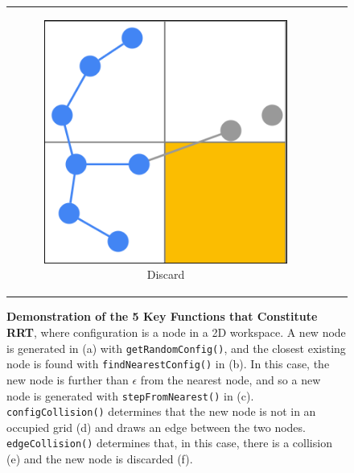 \begin{figure}[t!]
\begin{centering}
\begin{tabular}{ccc}
    \begin{subfigure}{0.3\linewidth}
    \includegraphics[width=\linewidth]{chapters/chapter2/img/keyfunctions/functions6.png}
    \caption{Discard}
    \label{rrt_functions_f}
    \end{subfigure} \\

\end{tabular}
\caption[Demonstration of the 5 Key Functions that Constitute RRT]{\textbf{Demonstration of the 5 Key Functions that Constitute RRT}, where configuration is a node in a 2D workspace. A new node is generated in (a) with \texttt{getRandomConfig()}, and the closest existing node is found with \texttt{findNearestConfig()} in (b). In this case, the new node is further than $\epsilon$ from the nearest node, and so a new node is generated with \texttt{stepFromNearest()} in (c). \texttt{configCollision()} determines that the new node is not in an occupied grid (d) and draws an edge between the two nodes. \texttt{edgeCollision()} determines that, in this case, there is a collision (e) and the new node is discarded (f).}
\label{fig:rrt_functions}
\end{centering}
\end{figure}